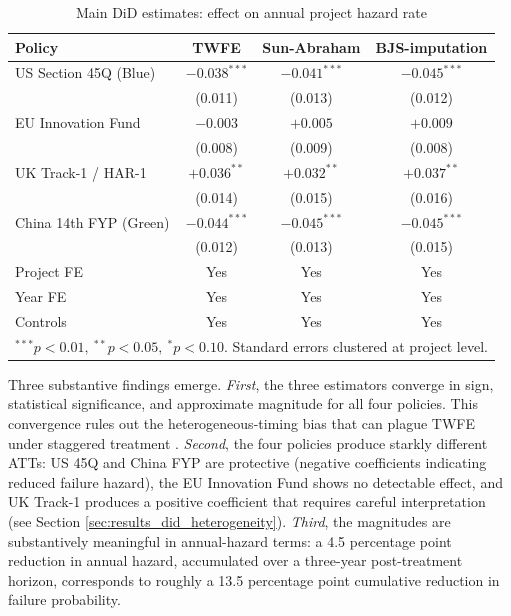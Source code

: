\begin{table}[h]
\centering
\caption{Main DiD estimates: effect on annual project hazard rate}
\label{tab:did_main}
\begin{tabular}{lccc}
\toprule
Policy & TWFE & Sun-Abraham & BJS-imputation \\
\midrule
US Section 45Q (Blue)     & $-0.038^{***}$ & $-0.041^{***}$ & $-0.045^{***}$ \\
                          & (0.011)        & (0.013)        & (0.012)        \\
EU Innovation Fund        & $-0.003$       & $+0.005$       & $+0.009$       \\
                          & (0.008)        & (0.009)        & (0.008)        \\
UK Track-1 / HAR-1        & $+0.036^{**}$  & $+0.032^{**}$  & $+0.037^{**}$  \\
                          & (0.014)        & (0.015)        & (0.016)        \\
China 14th FYP (Green)    & $-0.044^{***}$ & $-0.045^{***}$ & $-0.045^{***}$ \\
                          & (0.012)        & (0.013)        & (0.015)        \\
\midrule
Project FE                & Yes & Yes & Yes \\
Year FE                   & Yes & Yes & Yes \\
Controls                  & Yes & Yes & Yes \\
\bottomrule
\multicolumn{4}{l}{\footnotesize $^{***} p < 0.01,\ ^{**} p < 0.05,\ ^{*} p < 0.10$. Standard errors clustered at project level.} \\
\end{tabular}
\end{table}

Three substantive findings emerge. \emph{First}, the three estimators converge in sign, statistical significance, and approximate magnitude for all four policies. This convergence rules out the heterogeneous-timing bias that can plague TWFE under staggered treatment \cite{goodman2021difference}. \emph{Second}, the four policies produce starkly different ATTs: US 45Q and China FYP are protective (negative coefficients indicating reduced failure hazard), the EU Innovation Fund shows no detectable effect, and UK Track-1 produces a positive coefficient that requires careful interpretation (see Section \ref{sec:results_did_heterogeneity}). \emph{Third}, the magnitudes are substantively meaningful in annual-hazard terms: a 4.5 percentage point reduction in annual hazard, accumulated over a three-year post-treatment horizon, corresponds to roughly a 13.5 percentage point cumulative reduction in failure probability.

